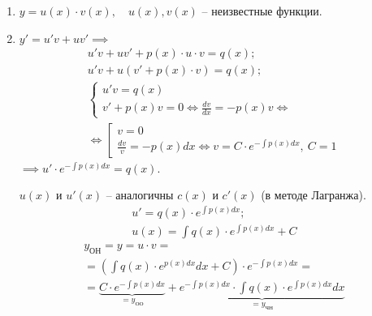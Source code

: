 \documentclass[11pt,a4paper,oneside]{report}
\theoremstyle{definition}
\theoremstyle{plain}
\theoremstyle{remark}
\begin{document}
\begin{enumerate}
    \item $y = u(x)\cdot v(x), \quad u(x), v(x)$ -- неизвестные функции.
    \item $y' = u'v + uv' \implies$
          \begin{align*}
              u'v + uv' + p(x) \cdot u \cdot v = q(x);              \\
              u'v + u(v' + p(x)\cdot v) = q(x);                     \\
              \left\{\begin{array}{l}
                         u'v = q(x) \\
                         v' + p(x)v = 0 \iff \frac{dv}{dx} = -p(x)v \iff
                     \end{array}\right. \\
              \iff \left[\begin{array}{l}
                             v = 0 \\
                             \frac{dv}{v} = -p(x)dx \iff v = C\cdot e^{-\int p(x)dx}, \ C = 1
                         \end{array}\right.
          \end{align*}
          $\implies u'\cdot e^{-\int p(x)dx} = q(x)$.

          $u(x)$ и $u'(x)$ -- аналогичны $c(x)$ и $c'(x)$ (в методе Лагранжа).
          \begin{align*}
              u'=q(x)\cdot e^{\int p(x)dx}; \\
              u(x) = \int q(x)\cdot e^{\int p(x)dx} + C
          \end{align*}
          \begin{multline*}
              y_\text{ОН} = y = u\cdot v = \\
              = \left(\int q(x)\cdot e^{p(x)dx}dx + C\right)\cdot e^{-\int p(x)dx} =\\
              = \underbrace{C\cdot e^{-\int p(x)dx}}_{=y_\text{ОО}} + \underbrace{e^{-\int p(x)dx}\cdot \int q(x)\cdot e^{\int p(x)dx}dx}_{=y_\text{ЧН}}
          \end{multline*}
\end{enumerate}
\end{document}
